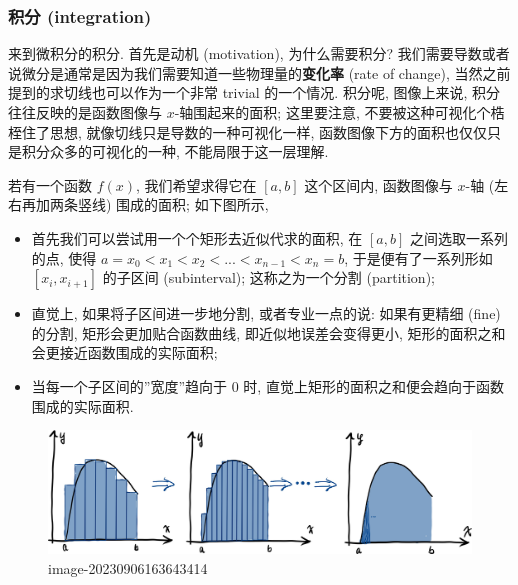 \hypertarget{ux79efux5206-integration}{%
\subsubsection{积分 (integration)}\label{ux79efux5206-integration}}

来到微积分的积分. 首先是动机 (motivation), 为什么需要积分?
我们需要导数或者说微分是通常是因为我们需要知道一些物理量的\textbf{变化率}
(rate of change), 当然之前提到的求切线也可以作为一个非常 trivial
的一个情况. 积分呢, 图像上来说, 积分往往反映的是函数图像与
\(x\)-轴围起来的面积; 这里要注意, 不要被这种可视化个梏桎住了思想,
就像切线只是导数的一种可视化一样,
函数图像下方的面积也仅仅只是积分众多的可视化的一种,
不能局限于这一层理解.

若有一个函数 \(f(x)\), 我们希望求得它在 \([a,b]\) 这个区间内, 函数图像与
\(x\)-轴 (左右再加两条竖线) 围成的面积; 如下图所示,

\begin{itemize}
\tightlist
\item
  首先我们可以尝试用一个个矩形去近似代求的面积, 在 \([a,b]\)
  之间选取一系列的点, 使得 \(a=x_0<x_1<x_2<...<x_{n-1}<x_{n}=b\),
  于是便有了一系列形如 \([x_i,x_{i+1}]\) 的子区间 (subinterval);
  这称之为一个分割 (partition);
\item
  直觉上, 如果将子区间进一步地分割, 或者专业一点的说: 如果有更精细
  (fine) 的分割, 矩形会更加贴合函数曲线, 即近似地误差会变得更小,
  矩形的面积之和会更接近函数围成的实际面积;
\item
  当每一个子区间的''宽度''趋向于 \(0\) 时,
  直觉上矩形的面积之和便会趋向于函数围成的实际面积.
\end{itemize}

\begin{figure}
\centering
\includegraphics{image-20230906163643414.png}
\caption{image-20230906163643414}
\end{figure}


